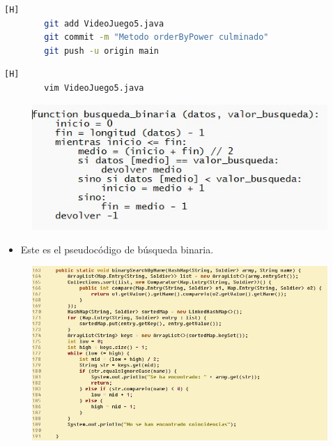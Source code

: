 \documentclass{article}
\begin{document}
	
	\begin{lstlisting}[language=bash,caption={Commit: d3af64e3678b36984d744ac19d598ea08e012bee}][H]
		git add VideoJuego5.java
		git commit -m "Metodo orderByPower culminado"			
		git push -u origin main
	\end{lstlisting}	
	
	
	
	\begin{lstlisting}[language=bash,caption={Se implementa el método que hace una búsqueda binaria del nombre solicitado}][H]
		vim VideoJuego5.java
	\end{lstlisting}
	
	\begin{figure}[H]
		\centering
		\includegraphics[width=1\textwidth,keepaspectratio]{img/binary.jpg}
	\end{figure}
	
	
	\begin{itemize}	
		\item Este es el pseudocódigo de búsqueda binaria.
	\end{itemize}
	
	\begin{figure}[H]
		\centering
		\includegraphics[width=1\textwidth,keepaspectratio]{img/binarySearchByName.jpg}
	\end{figure}
	
\end{document}
